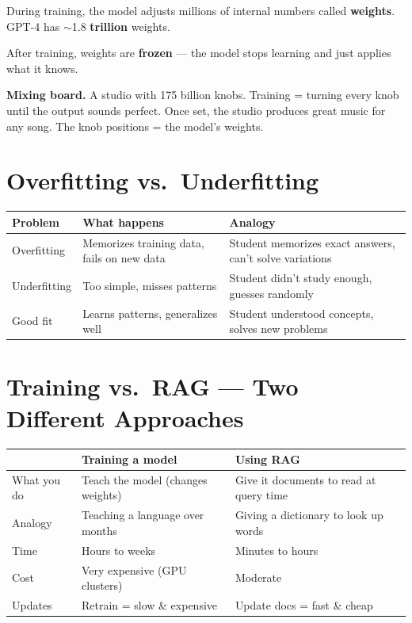 \documentclass[11pt,a4paper]{report}
\begin{document}
During training, the model adjusts millions of internal numbers called \textbf{weights}. GPT-4 has $\sim$1.8 \textbf{trillion} weights.

After training, weights are \textbf{frozen} --- the model stops learning and just applies what it knows.

\begin{analogybox}
\textbf{Mixing board.} A studio with 175 billion knobs. Training = turning every knob until the output sounds perfect. Once set, the studio produces great music for any song. The knob positions = the model's weights.
\end{analogybox}

\section{Overfitting vs.\ Underfitting}

\begin{table}[h]
\centering
\begin{tabularx}{\textwidth}{l X X}
\toprule
\textbf{Problem} & \textbf{What happens} & \textbf{Analogy} \\
\midrule
Overfitting & Memorizes training data, fails on new data & Student memorizes exact answers, can't solve variations \\
Underfitting & Too simple, misses patterns & Student didn't study enough, guesses randomly \\
Good fit & Learns patterns, generalizes well & Student understood concepts, solves new problems \\
\bottomrule
\end{tabularx}
\end{table}

\section{Training vs.\ RAG --- Two Different Approaches}

\begin{table}[h]
\centering
\begin{tabularx}{\textwidth}{l X X}
\toprule
& \textbf{Training a model} & \textbf{Using RAG} \\
\midrule
What you do & Teach the model (changes weights) & Give it documents to read at query time \\
Analogy & Teaching a language over months & Giving a dictionary to look up words \\
Time & Hours to weeks & Minutes to hours \\
Cost & Very expensive (GPU clusters) & Moderate \\
Updates & Retrain = slow \& expensive & Update docs = fast \& cheap \\
\bottomrule
\end{tabularx}
\end{table}
\end{document}
